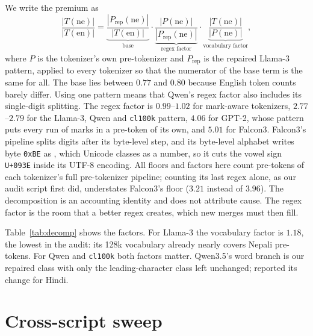 We write the premium as
\begin{equation*}
\frac{|T(\text{ne})|}{|T(\text{en})|} = \underbrace{\frac{|P_{\text{rep}}(\text{ne})|}{|T(\text{en})|}}_{\text{base}} \cdot \underbrace{\frac{|P(\text{ne})|}{|P_{\text{rep}}(\text{ne})|}}_{\text{regex factor}} \cdot \underbrace{\frac{|T(\text{ne})|}{|P(\text{ne})|}}_{\text{vocabulary factor}},
\end{equation*}
where $P$ is the tokenizer's own pre-tokenizer and $P_{\text{rep}}$ is the repaired Llama-3 pattern, applied to every tokenizer so that the numerator of the base term is the same for all. The base lies between $0.77$ and $0.80$ because English token counts barely differ. Using one pattern means that Qwen's regex factor also includes its single-digit splitting. The regex factor is $0.99$--$1.02$ for mark-aware tokenizers, $2.77$--$2.79$ for the Llama-3, Qwen and \texttt{cl100k} pattern, $4.06$ for GPT-2, whose pattern puts every run of marks in a pre-token of its own, and $5.01$ for Falcon3. Falcon3's pipeline splits digits after its byte-level step, and its byte-level alphabet writes byte \texttt{0xBE} as \textthreequarters{}, which Unicode classes as a number, so it cuts the vowel sign \texttt{U+093E} inside its UTF-8 encoding. All floors and factors here count pre-tokens of each tokenizer's full pre-tokenizer pipeline; counting its last regex alone, as our audit script first did, understates Falcon3's floor ($3.21$ instead of $3.96$). The decomposition is an accounting identity and does not attribute cause. The regex factor is the room that a better regex creates, which new merges must then fill.

Table~\ref{tab:decomp} shows the factors. For Llama-3 the vocabulary factor is $1.18$, the lowest in the audit: its 128k vocabulary already nearly covers Nepali pre-tokens. For Qwen and \texttt{cl100k} both factors matter. Qwen3.5's word branch is our repaired class with only the leading-character class left unchanged; \citet{land2026smallbugs} reported its change for Hindi.



\section{Cross-script sweep}
\label{app:xling}

